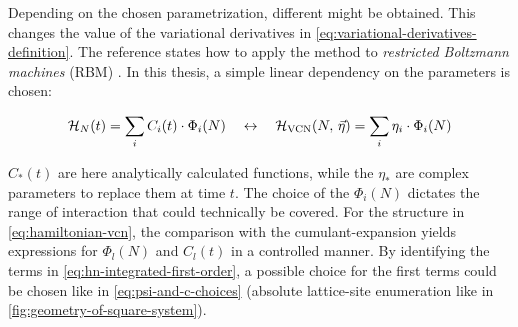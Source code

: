 Depending on the chosen parametrization, different \Hvcn{\vec{\eta}} might be obtained. 
This changes the value of the variational derivatives in \autoref{eq:variational-derivatives-definition}.
The reference \cite{VCNsolutionForRBM} states how to apply the method to \emph{restricted Boltzmann machines} (RBM) \cite{neuralNetworkQuantumStates}.
In this thesis, a simple linear dependency on the parameters is chosen:

\begin{equation}
    \label{eq:hamiltonian-vcn}
    \HNOft = \lsum[i] C_i(t) \cdot \Phi_i(N) \quad\leftrightarrow\quad \Hvcn{\vec{\eta}} = \lsum[i] \eta_i \cdot \Phi_i(N)
\end{equation}

$C_\ast(t)$ are here analytically calculated functions, while the $\eta_\ast$ are complex parameters to replace them at time $t$.
The choice of the $\Phi_i(N)$ dictates the range of interaction that could technically be covered.
For the structure in \autoref{eq:hamiltonian-vcn}, the comparison with the cumulant-expansion yields expressions for $\Phi_l(N)$ and $C_l(t)$ in a controlled manner.
By identifying the terms in \autoref{eq:hn-integrated-first-order}, a possible choice for the first terms could be chosen like in \autoref{eq:psi-and-c-choices} (absolute lattice-site enumeration like in \autoref{fig:geometry-of-square-system}). 


